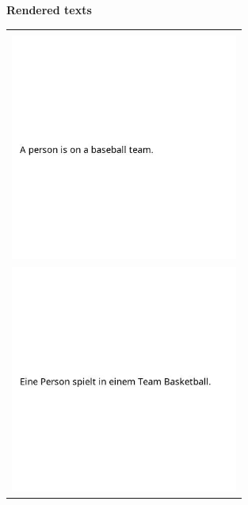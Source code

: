 \begin{figure}[h]
\centering
\textbf{Rendered texts}

\begin{tabular}{|p{0.7\linewidth}|}
\hline \\
\includegraphics[width=\linewidth,frame]{figures/examples_assests/visual_sts/image_1.png}\\ \includegraphics[width=\linewidth,frame]{figures/examples_assests/visual_sts/image_2.png} \\

\end{tabular}
\end{figure}
